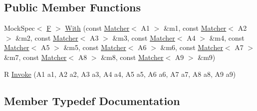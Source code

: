 \subsection*{Public Member Functions}
\begin{DoxyCompactItemize}
\item 
Mock\+Spec$<$ \mbox{\hyperlink{classtesting_1_1internal_1_1_function_mocker_3_01_r_07_a1_00_01_a2_00_01_a3_00_01_a4_00_01_a5_00d00d8722bf1ad86ca8049508f133d393_a8de64ec5559bd4e4410a4374e9c93e4e}{F}} $>$ \mbox{\hyperlink{classtesting_1_1internal_1_1_function_mocker_3_01_r_07_a1_00_01_a2_00_01_a3_00_01_a4_00_01_a5_00d00d8722bf1ad86ca8049508f133d393_a1f1550da18c3902fa9afee5e8031cfc9}{With}} (const \mbox{\hyperlink{classtesting_1_1_matcher}{Matcher}}$<$ A1 $>$ \&m1, const \mbox{\hyperlink{classtesting_1_1_matcher}{Matcher}}$<$ A2 $>$ \&m2, const \mbox{\hyperlink{classtesting_1_1_matcher}{Matcher}}$<$ A3 $>$ \&m3, const \mbox{\hyperlink{classtesting_1_1_matcher}{Matcher}}$<$ A4 $>$ \&m4, const \mbox{\hyperlink{classtesting_1_1_matcher}{Matcher}}$<$ A5 $>$ \&m5, const \mbox{\hyperlink{classtesting_1_1_matcher}{Matcher}}$<$ A6 $>$ \&m6, const \mbox{\hyperlink{classtesting_1_1_matcher}{Matcher}}$<$ A7 $>$ \&m7, const \mbox{\hyperlink{classtesting_1_1_matcher}{Matcher}}$<$ A8 $>$ \&m8, const \mbox{\hyperlink{classtesting_1_1_matcher}{Matcher}}$<$ A9 $>$ \&m9)
\item 
R \mbox{\hyperlink{classtesting_1_1internal_1_1_function_mocker_3_01_r_07_a1_00_01_a2_00_01_a3_00_01_a4_00_01_a5_00d00d8722bf1ad86ca8049508f133d393_a41568c246919848be0f760c61afb3382}{Invoke}} (A1 a1, A2 a2, A3 a3, A4 a4, A5 a5, A6 a6, A7 a7, A8 a8, A9 a9)
\end{DoxyCompactItemize}


\subsection{Member Typedef Documentation}
\mbox{\label{classtesting_1_1internal_1_1_function_mocker_3_01_r_07_a1_00_01_a2_00_01_a3_00_01_a4_00_01_a5_00d00d8722bf1ad86ca8049508f133d393_afcb802dfc6e26a318bd0599846bff218}} 
